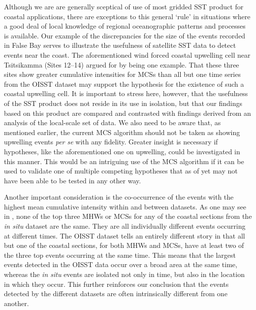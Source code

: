 \documentclass[a4paper,10pt,review]{elsarticle}
\begin{document}
Although we are are generally sceptical of use of most gridded SST product for coastal applications, there are exceptions to this general `rule' in situations where a good deal of local knowledge of regional oceanographic patterns and processes is available. Our example of the discrepancies for the size of the events recorded in False Bay serves to illustrate the usefulness of satellite SST data to detect events near the coast. The aforementioned wind forced coastal upwelling cell near Tsitsikamma (Sites 12--14) argued for by \citet{Roberts2005} being one example. That these three sites show greater cumulative intensities for MCSs than all but one time series from the OISST dataset may support the hypothesis for the existence of such a coastal upwelling cell. It is important to stress here, however, that the usefulness of the SST product does not reside in its use in isolation, but that our findings based on this product are compared and contrasted with findings derived from an analysis of the local-scale set of data. We also need to be aware that, as mentioned earlier, the current MCS algorithm should not be taken as showing upwelling events \emph{per se} with any fidelity. Greater insight is necessary if hypotheses, like the aforementioned one on upwelling, could be investigated in this manner. This would be an intriguing use of the MCS algorithm if it can be used to validate one of multiple competing hypotheses that as of yet may not have been able to be tested in any other way.

Another important consideration is the co-occurrence of the events with the highest mean cumulative intensity within and between datasets. As one may see in , none of the top three MHWs or MCSs for any of the coastal sections from the \emph{in situ} dataset are the same. They are all individually different events occurring at different times. The OISST dataset tells an entirely different story in that all but one of the coastal sections, for both MHWs and MCSs, have at least two of the three top events occurring at the same time. This means that the largest events detected in the OISST data occur over a broad area at the same time, whereas the \emph{in situ} events are isolated not only in time, but also in the location in which they occur. This further reinforces our conclusion that the events detected by the different datasets are often intrinsically different from one another.
\end{document}
